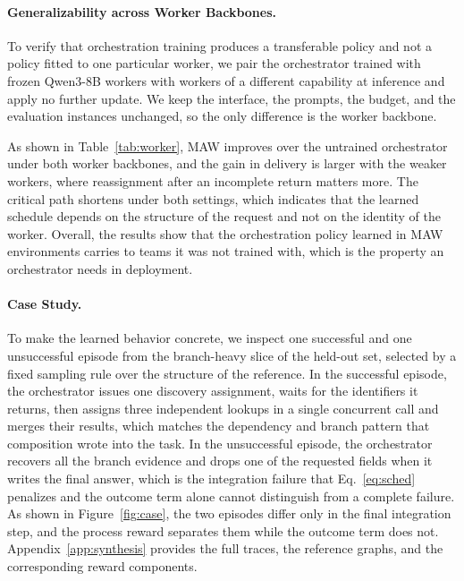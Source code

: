\paragraph{Generalizability across Worker Backbones.}
\label{sec:worker}

To verify that orchestration training produces a transferable policy and not a policy fitted to one particular worker, we pair the orchestrator trained with frozen Qwen3-8B workers with workers of a different capability at inference and apply no further update.
We keep the interface, the prompts, the budget, and the evaluation instances unchanged, so the only difference is the worker backbone.



As shown in Table~\ref{tab:worker}, MAW improves over the untrained orchestrator under both worker backbones, and the gain in delivery is larger with the weaker workers, where reassignment after an incomplete return matters more.
The critical path shortens under both settings, which indicates that the learned schedule depends on the structure of the request and not on the identity of the worker.
Overall, the results show that the orchestration policy learned in MAW environments carries to teams it was not trained with, which is the property an orchestrator needs in deployment.

\paragraph{Case Study.}
\label{sec:case}

To make the learned behavior concrete, we inspect one successful and one unsuccessful episode from the branch-heavy slice of the held-out set, selected by a fixed sampling rule over the structure of the reference.
In the successful episode, the orchestrator issues one discovery assignment, waits for the identifiers it returns, then assigns three independent lookups in a single concurrent call and merges their results, which matches the dependency and branch pattern that composition wrote into the task.
In the unsuccessful episode, the orchestrator recovers all the branch evidence and drops one of the requested fields when it writes the final answer, which is the integration failure that Eq.~\ref{eq:sched} penalizes and the outcome term alone cannot distinguish from a complete failure.
As shown in Figure~\ref{fig:case}, the two episodes differ only in the final integration step, and the process reward separates them while the outcome term does not.
Appendix~\ref{app:synthesis} provides the full traces, the reference graphs, and the corresponding reward components.

